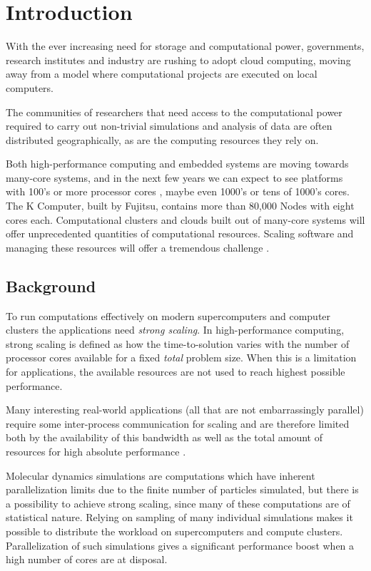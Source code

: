 \chapter{Introduction}
With the ever increasing need for storage and computational power,
governments, research institutes and industry are rushing to adopt
cloud computing, moving away from a model where computational projects
are executed on local computers.

The communities of researchers that need access to the computational
power required to carry out non-trivial simulations and analysis of
data are often distributed geographically, as are the computing
resources they rely on.

Both high-performance computing and embedded systems are moving
towards many-core systems, and in the next few years we can expect to
see platforms with 100's or more processor cores \citep{leupers:2011},
maybe even 1000's or tens of 1000's cores. The K Computer, built by
Fujitsu, contains more than 80,000 Nodes with eight cores
each. Computational clusters and clouds built out of many-core systems
will offer unprecedented quantities of computational
resources. Scaling software and managing these resources will offer a
tremendous challenge \citep{csail:2009}.


\section{Background}
To run computations effectively on modern supercomputers and computer
clusters the applications need \emph{strong scaling}. In
high-performance computing, strong scaling is defined as how the
time-to-solution varies with the number of processor cores available
for a fixed \emph{total} problem size. When this is a limitation for
applications, the available resources are not used to reach highest
possible performance.

Many interesting real-world applications (all that are not
embarrassingly parallel) require some inter-process communication for
scaling and are therefore limited both by the availability of this
bandwidth as well as the total amount of resources for high absolute
performance \citep{pronk:2011}.

Molecular dynamics simulations are computations which have inherent
parallelization limits due to the finite number of particles
simulated, but there is a possibility to achieve strong scaling, since
many of these computations are of statistical nature. Relying on
sampling of many individual simulations makes it possible to
distribute the workload on supercomputers and compute
clusters. Parallelization of such simulations gives a significant
performance boost when a high number of cores are at disposal.

